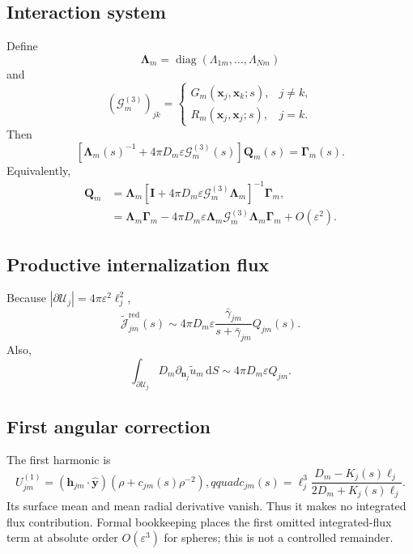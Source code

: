 \documentclass[pdflatex,sn-mathphys-num]{sn-jnl}
\numberwithin{equation}{section}
\theoremstyle{thmstyleone}%
\theoremstyle{definition}
\theoremstyle{remark}
\begin{document}
\begin{appendices}
\subsection{Interaction system}

Define
\[
\bm\Lambda_m=\operatorname{diag}(\Lambda_{1m},\ldots,\Lambda_{Nm})
\]
and
\begin{equation}
(\bm{\mathcal G}^{(3)}_m)_{jk}=
\begin{cases}
G_m(\mathbf x_j,\mathbf x_k;s),&j\ne k,\\[1mm]
R_m(\mathbf x_j,\mathbf x_j;s),&j=k.
\end{cases}
\label{eq:app_3d_G_matrix}
\end{equation}
Then
\begin{equation}
\left[\bm\Lambda_m(s)^{-1}
+4\pi D_m\varepsilon\bm{\mathcal G}^{(3)}_m(s)\right]
\mathbf Q_m(s)=\bm\Gamma_m(s).
\label{eq:app_3d_matrix_system}
\end{equation}
Equivalently,
\begin{align}
\mathbf Q_m
&=\bm\Lambda_m\left[
\mathbf I+4\pi D_m\varepsilon\bm{\mathcal G}^{(3)}_m\bm\Lambda_m
\right]^{-1}\bm\Gamma_m,
\label{eq:app_3d_Q_resummed}\\
&=\bm\Lambda_m\bm\Gamma_m
-4\pi D_m\varepsilon\bm\Lambda_m\bm{\mathcal G}^{(3)}_m
\bm\Lambda_m\bm\Gamma_m+O(\varepsilon^2).
\label{eq:app_3d_Q_expansion}
\end{align}

\subsection{Productive internalization flux}

Because $|\partial\mathcal U_j|=4\pi\varepsilon^2\ell_j^2$,
\begin{equation}
\widetilde{\mathcal J}^{\mathrm{red}}_{jm}(s)
\sim4\pi D_m\varepsilon
\frac{\bar\gamma_{jm}}{s+\bar\gamma_{jm}}Q_{jm}(s).
\label{eq:app_3d_productive_flux}
\end{equation}
Also,
\begin{equation}
\int_{\partial\mathcal U_j}D_m\partial_{\mathbf n_j}
\widetilde u_m\,\mathrm dS\sim4\pi D_m\varepsilon Q_{jm}.
\label{eq:app_3d_net_flux}
\end{equation}

\subsection{First angular correction}

The first harmonic is
\begin{equation}
U^{(1)}_{jm}=(\mathbf h_{jm}\cdot\widehat{\mathbf y})
\left(\rho+c_{jm}(s)\rho^{-2}\right),qquad
c_{jm}(s)=\ell_j^3
\frac{D_m-K_j(s)\ell_j}{2D_m+K_j(s)\ell_j}.
\label{eq:app_3d_dipole}
\end{equation}
Its surface mean and mean radial derivative vanish. Thus it makes no integrated
flux contribution. Formal bookkeeping places the first omitted integrated-flux
term at absolute order $O(\varepsilon^3)$ for spheres; this is not a controlled
remainder.


\end{appendices}
\end{document}
